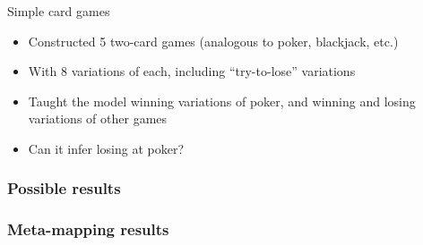\documentclass{beamer}
\begin{document}
\begin{frame}{Simple card games}

\begin{itemize}
\item Constructed 5 two-card games (analogous to poker, blackjack, etc.)
\item With 8 variations of each, including ``try-to-lose'' variations
\item Taught the model winning variations of poker, and winning and losing variations of other games 
\item Can it infer losing at poker?
\end{itemize}
%
\end{frame}


\begin{frame}
\frametitle<1>{Possible results}
\frametitle<2->{Meta-mapping results}
\end{frame}
\end{document}
